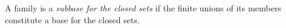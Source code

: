 A family is a \emph{subbase for the closed sets} if the finite unions of its members constitute a base for the closed sets.
